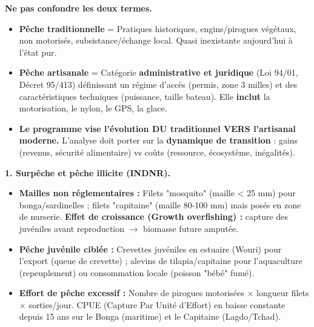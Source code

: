 \documentclass[11pt]{article}
\begin{document}
\begin{attention}
\textbf{Ne pas confondre les deux termes.}
\begin{itemize}
\item \textbf{Pêche traditionnelle} = Pratiques historiques, engins/pirogues végétaux, non motorisés, subsistance/échange local. Quasi inexistante aujourd'hui à l'état pur.
\item \textbf{Pêche artisanale} = Catégorie \textbf{administrative et juridique} (Loi 94/01, Décret 95/413) définissant un régime d'accès (permis, zone 3 milles) et des caractéristiques techniques (puissance, taille bateau). Elle \textbf{inclut} la motorisation, le nylon, le GPS, la glace.
\item \textbf{Le programme vise l'évolution DU traditionnel VERS l'artisanal moderne.} L'analyse doit porter sur la \textbf{dynamique de transition} : gains (revenus, sécurité alimentaire) vs coûts (ressource, écosystème, inégalités).
\end{itemize}
\end{attention}

\textbf{1. Surpêche et pêche illicite (INDNR).}\par
\begin{itemize}
\item \textbf{Mailles non réglementaires :} Filets "mosquito" (maille < 25 mm) pour bonga/sardinelles ; filets "capitaine" (maille 80-100 mm) mais posés en zone de nurserie. \textbf{Effet de croissance (Growth overfishing) :} capture des juvéniles avant reproduction $\rightarrow$ biomasse future amputée.
\item \textbf{Pêche juvénile ciblée :} Crevettes juvéniles en estuaire (Wouri) pour l'export (queue de crevette) ; alevins de tilapia/capitaine pour l'aquaculture (repeuplement) ou consommation locale (poisson "bébé" fumé).
\item \textbf{Effort de pêche excessif :} Nombre de pirogues motorisées $\times$ longueur filets $\times$ sorties/jour. CPUE (Capture Par Unité d'Effort) en baisse constante depuis 15 ans sur le Bonga (maritime) et le Capitaine (Lagdo/Tchad).
\end{itemize}
\end{document}

